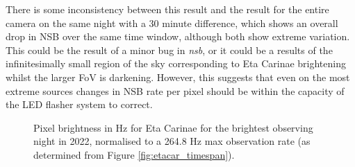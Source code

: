 There is some inconsistency between this result and the result for the entire camera on the same night with a 30 minute difference, which shows an overall drop in NSB over the same time window, although both show extreme variation. This could be the result of a minor bug in \textit{nsb}, or it could be a results of the infinitesimally small region of the sky corresponding to Eta Carinae brightening whilst the larger FoV is darkening. However, this suggests that even on the most extreme sources changes in NSB rate per pixel should be within the capacity of the LED flasher system to correct. 

\begin{figure}[ht]
\begin{centering}
\caption{Pixel brightness in Hz for Eta Carinae for the brightest observing night in 2022, normalised to a 264.8 Hz max observation rate (as determined from Figure \ref{fig:etacar_timespan}).}
\label{fig:etacar_timespan_extreme}
\end{centering}
\end{figure}
\newpage
